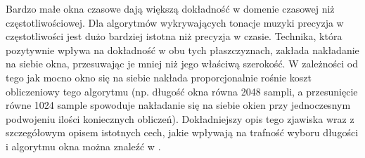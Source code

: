 \documentclass[12pt,a4paper,twoside]{mwart}
\begin{document}
Bardzo małe okna czasowe dają większą dokładność w domenie czasowej niż częstotliwościowej. Dla algorytmów wykrywających tonacje muzyki precyzja w częstotliwości jest dużo bardziej istotna niż precyzja w czasie. Technika, która pozytywnie wpływa na dokładność w obu tych płaszczyznach, zakłada nakładanie na siebie okna, przesuwając je mniej niż jego właściwą szerokość. W zależności od tego jak mocno okno się na siebie nakłada proporcjonalnie rośnie koszt obliczeniowy tego algorytmu (np. długość okna równa 2048 sampli, a przesunięcie równe 1024 sample spowoduje nakładanie się na siebie okien przy jednoczesnym podwojeniu ilości koniecznych obliczeń). Dokładniejszy opis tego zjawiska wraz z szczegółowym opisem istotnych cech, jakie wpływają na trafność wyboru długości i algorytmu okna można znaleźć w \cite{WindowChoiceStrategiesSTFT}.
\end{document}
